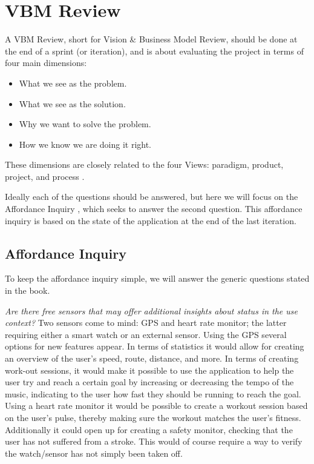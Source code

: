 \section{VBM Review}
A VBM Review, short for Vision \& Business Model Review, should be done at the end of a sprint (or iteration), and is about evaluating the project in terms of four main dimensions:

\begin{itemize}
	\item What we see as the problem.
	\item What we see as the solution.
	\item Why we want to solve the problem.
	\item How we know we are doing it right.
\end{itemize}

These dimensions are closely related to the four Views: paradigm, product, project, and process \citep[pp. 44-47]{essence}.

Ideally each of the questions should be answered, but here we will focus on the Affordance Inquiry \citep[pp. 59-60]{essence}, which seeks to answer the second question. This affordance inquiry is based on the state of the application at the end of the last iteration.

\subsection*{Affordance Inquiry}
To keep the affordance inquiry simple, we will answer the generic questions stated in the book.

\textit{Are there free sensors that may offer additional insights about status in the use context?}
Two sensors come to mind: GPS and heart rate monitor; the latter requiring either a smart watch or an external sensor.
Using the GPS several options for new features appear.
In terms of statistics it would allow for creating an overview of the user's speed, route, distance, and more.
In terms of creating work-out sessions, it would make it possible to use the application to help the user try and reach a certain goal by increasing or decreasing the tempo of the music, indicating to the user how fast they should be running to reach the goal.
Using a heart rate monitor it would be possible to create a workout session based on the user's pulse, thereby making sure the workout matches the user's fitness.
Additionally it could open up for creating a safety monitor, checking that the user has not suffered from a stroke.
This would of course require a way to verify the watch/sensor has not simply been taken off.

